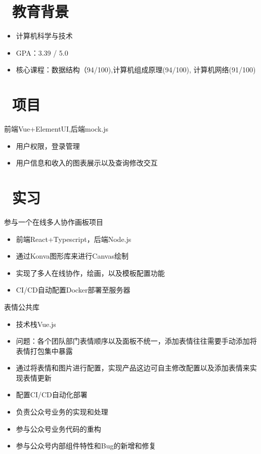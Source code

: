 \documentclass{resume}
\begin{document}


\section{\faGraduationCap\  教育背景}
\begin{itemize}
  \item 计算机科学与技术 
  \item GPA：3.39 / 5.0
  \item 核心课程：数据结构（94/100),计算机组成原理(94/100), 计算机网络(91/100)
\end{itemize}

\section{\faUsers\ 项目}
前端Vue+ElementUI,后端mock.js
\begin{itemize}
  \item 用户权限，登录管理
  \item 用户信息和收入的图表展示以及查询修改交互
\end{itemize}

\section{\faUsers\ 实习}
参与一个在线多人协作画板项目
\begin{itemize}
  \item 前端React+Typescript，后端Node.js
  \item 通过Konva图形库来进行Canvas绘制
  \item 实现了多人在线协作，绘画，以及模板配置功能
  \item CI/CD自动配置Docker部署至服务器
\end{itemize}

表情公共库
\begin{itemize}
  \item 技术栈Vue.js
  \item 问题：各个团队部门表情顺序以及面板不统一，添加表情往往需要手动添加将表情打包集中暴露
  \item 通过将表情和图片进行配置，实现产品这边可自主修改配置以及添加表情来实现表情更新
  \item 配置CI/CD自动化部署
\end{itemize}
\begin{itemize}
  \item 负责公众号业务的实现和处理
  \item 参与公众号业务代码的重构
  \item 参与公众号内部组件特性和Bug的新增和修复
\end{itemize}
\end{document}
